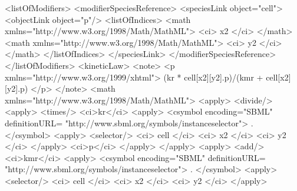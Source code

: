 \documentclass{cekarticle}
\begin{document}
\begin{example}
            <listOfModifiers>
                <modifierSpeciesReference>
                    <speciesLink object="cell">
                        <objectLink object="p"/>
                        <listOfIndices>
                            <math xmlns="http://www.w3.org/1998/Math/MathML">
                                <ci> x2 </ci>
                            </math>
                            <math xmlns="http://www.w3.org/1998/Math/MathML">
                                <ci> y2 </ci>
                            </math>
                        </listOfIndices>
                    </speciesLink>
                </modifierSpeciesReference>
            </listOfModifiers>
            <kineticLaw>
                <note>
                    <p xmlns="http://www.w3.org/1999/xhtml">
                        (kr * cell[x2][y2].p)/(kmr + cell[x2][y2].p)
                    </p>
                </note>
                <math xmlns="http://www.w3.org/1998/Math/MathML">
                    <apply>
                        <divide/>
                        <apply>
                            <times/>
                            <ci>kr</ci>
                            <apply>
                                <csymbol
                                    encoding="SBML"
                                    definitionURL=
                                        "http://www.sbml.org/symbols/instanceselector">
                                    .
                                </csymbol>
                                <apply>
                                    <selector/>
                                    <ci> cell </ci>
                                    <ci> x2 </ci>
                                    <ci> y2 </ci>
                                </apply>
                                <ci>p</ci>
                            </apply>
                        </apply>    
                        <apply>
                            <add/>
                            <ci>kmr</ci>
                            <apply>
                                <csymbol
                                    encoding="SBML"
                                    definitionURL=
                                        "http://www.sbml.org/symbols/instanceselector">
                                    .
                                </csymbol>
                                <apply>
                                    <selector/>
                                    <ci> cell </ci>
                                    <ci> x2 </ci>
                                    <ci> y2 </ci>
                                </apply>

\end{example}
\end{document}
